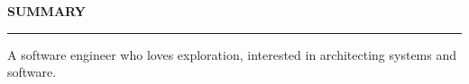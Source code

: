 \noindent\textcolor{themecolor}{\textbf{SUMMARY}}

\vspace{2mm}
\hrule
\vspace{3mm}
\noindent A software engineer who loves exploration, interested in architecting systems and software.


